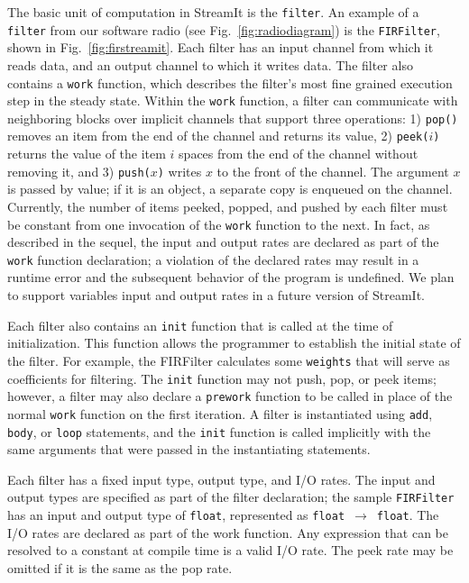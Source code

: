 \documentclass[final]{ijpp}
\begin{document}
The basic unit of computation  in StreamIt is the \texttt{filter}.  An
example   of  a   \texttt{filter}   from  our   software  radio   (see
Fig.~\ref{fig:radiodiagram})  is  the  \texttt{FIRFilter}, shown  in
Fig.~\ref{fig:firstreamit}.  Each  filter has an  input channel from
which it  reads data, and an  output channel to which  it writes data.
The filter also contains a \texttt{work} function, which describes the
filter's most fine grained execution step in the steady state.  Within
the \texttt{work} function, a  filter can communicate with neighboring
blocks  over  implicit  channels  that support  three  operations:  1)
\texttt{pop()} removes an item from the end of the channel and returns
its value,  2) \texttt{peek($i$)}  returns the value  of the  item $i$
spaces  from  the end  of  the channel  without  removing  it, and  3)
\texttt{push($x$)}  writes  $x$ to  the  front  of  the channel.   The
argument $x$ is  passed by value; if it is an  object, a separate copy
is enqueued  on the  channel. Currently, the  number of  items peeked,
popped, and pushed by each filter must be constant from one invocation
of the \texttt{work}  function to the next.  In  fact, as described in
the sequel,  the input and  output rates are  declared as part  of the
\texttt{work} function declaration; a  violation of the declared rates
may  result in  a runtime  error and  the subsequent  behavior  of the
program is  undefined. We plan  to support variables input  and output
rates in a future version of StreamIt.

Each filter also contains an  \texttt{init} function that is called at
the time  of initialization.  This  function allows the  programmer to
establish the initial state of the filter.  For example, the FIRFilter
calculates some  \texttt{weights} that will serve  as coefficients for
filtering.   The \texttt{init}  function may  not push,  pop,  or peek
items; however, a filter  may also declare a \texttt{prework} function
to  be called in  place of  the normal  \texttt{work} function  on the
first  iteration.   A   filter  is  instantiated  using  \texttt{add},
\texttt{body},  or  \texttt{loop}  statements, and  the  \texttt{init}
function is called implicitly with the same arguments that were passed
in the instantiating statements.

Each filter has  a fixed input type, output type,  and I/O rates.  The
input  and  output   types  are  specified  as  part   of  the  filter
declaration;  the sample  \texttt{FIRFilter} has  an input  and output
type         of         \texttt{float},         represented         as
\texttt{float}~$\rightarrow$~\texttt{float}.   The I/O rates  are declared
as part of the work function.   Any expression that can be resolved to
a constant at compile time is a  valid I/O rate.  The peek rate may be
omitted if it is the same as the pop rate.
\end{document}

